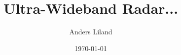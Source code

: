 \newcommand{\mytitle}{Ultra-Wideband Radar...}
\newcommand{\mygroupnumber}{1}
\newcommand{\myauthor}{Anders Liland}

\title{\mytitle}
\author{\myauthor}
\date{\today}

